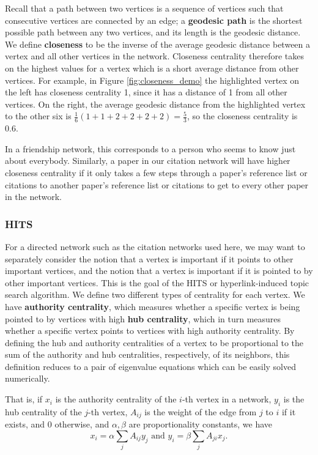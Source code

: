 \documentclass[12pt]{thesis}
\theoremstyle{plain}
\theoremstyle{definition}
\theoremstyle{remark}
\begin{document}
Recall that a path between two vertices is a sequence of vertices such that consecutive vertices are connected by an edge; a \textbf{geodesic path} is the shortest possible path between any two vertices, and its length is the geodesic distance. We define \textbf{closeness} to be the inverse of the average geodesic distance between a vertex and all other vertices in the network. Closeness centrality therefore takes on the highest values for a vertex which is a short average distance from other vertices. For example, in Figure \ref{fig:closeness_demo} the highlighted vertex on the left has closeness centrality 1, since it has a distance of 1 from all other vertices. On the right, the average geodesic distance from the highlighted vertex to the other six is $\frac{1}{6}(1+1+2+2+2+2)=\frac{5}{3}$, so the closeness centrality is 0.6.

In a friendship network, this corresponds to a person who seems to know just about everybody. Similarly, a paper in our citation network will have higher closeness centrality if it only takes a few steps through a paper's reference list or citations to another paper's reference list or citations to get to every other paper in the network. 

\subsubsection{HITS}
For a directed network such as the citation networks used here, we may want to separately consider the notion that a vertex is important if it points to other important vertices, and the notion that a vertex is important if it is pointed to by other important vertices. This is the goal of the HITS or hyperlink-induced topic search algorithm.  We define two different types of centrality for each vertex. We have \textbf{authority centrality}, which measures whether a specific vertex is being pointed to by vertices with high \textbf{hub centrality}, which in turn measures whether a  specific vertex points to vertices with high authority centrality. By defining the hub and authority centralities of a vertex to be proportional to the sum of the authority and hub centralities, respectively, of its neighbors, this definition reduces to a pair of eigenvalue equations which can be easily solved numerically. 

That is, if $x_i$ is the authority centrality of the $i$-th vertex in a network, $y_i$ is the hub centrality of the $j$-th vertex, $A_{ij}$ is the weight of the edge from $j$ to $i$ if it exists, and 0 otherwise, and $\alpha, \beta$ are proportionality constants, we have
\[x_i = \alpha \sum_j A_{ij}y_j\text{ and } y_i = \beta \sum_j A_{ji}x_j.\]
\end{document}
